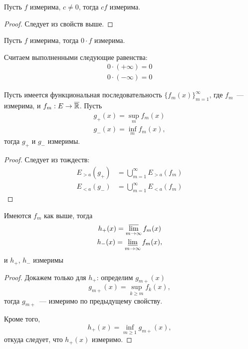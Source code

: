 \documentclass[main]{subfiles}
\begin{document}
\begin{property}
    Пусть $f$ измерима, $c \neq 0$, тогда $cf$ измерима.
\end{property}
\begin{proof}
    Следует из свойств выше.
\end{proof}

\begin{property}
    Пусть $f$ измерима, тогда $0 \cdot f$ измерима.
\end{property}

\begin{remark}
    Считаем выполненными следующие равенства:
    \begin{gather*}
        0 \cdot(+\infty) = 0\\
        0 \cdot(-\infty) = 0
    \end{gather*}
\end{remark}

\begin{property}
    Пусть имеется функциональная последовательность $\{f_m(x)\}_{m=1}^\infty$, где $f_m$~--- измерима, и $f_m: E \to \overline{\mathbb{R}}$.
    Пусть
    \begin{gather*}
        g_{+}(x) = \sup_{m} f_m(x) \\
        g_{-}(x) = \inf_{m} f_m(x),
    \end{gather*}
    тогда $g_+$ и $g_-$ измеримы.
\end{property}
\begin{proof}
    Следует из тождеств:
    \[\begin{aligned}
            E_{>a} (g_+) & = \bigcup_{m=1}^\infty E_{>a}(f_m) \\
            E_{<a} (g_-) & = \bigcup_{m=1}^\infty E_{<a}(f_m)
        \end{aligned}\tag{2}\]
\end{proof}

\begin{property}
    Имеются $f_m$ как выше, тогда
    \begin{gather*}
        h_+(x) = \varlimsup_{m \to \infty} f_m(x) \\
        h_-(x) = \varliminf_{m \to \infty} f_m(x),
    \end{gather*}
    и $h_+$, $h_-$ измеримы
\end{property}
\begin{proof}
    Докажем только для $h_+$: определим $g_{m+}(x)$
    \[g_{m+} (x) = \sup_{k\ge m} f_k(x),\]
    тогда $g_{m+}$~--- измеримо по предыдущему свойству.

    Кроме того,
    \[h_+(x) = \inf_{m \ge 1} g_{m+}(x), \tag{3}\]
    откуда следует, что $h_+(x)$ измеримо.
\end{proof}
\end{document}
